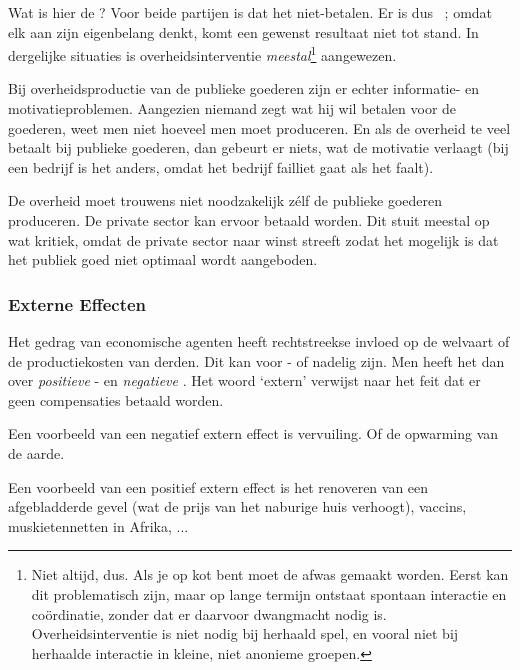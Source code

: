 Wat is hier de ? Voor beide partijen is dat het niet-betalen. Er is dus \mbox{ ;} omdat elk aan zijn eigenbelang denkt, komt een gewenst resultaat niet tot stand. In dergelijke situaties is overheidsinterventie \textit{meestal}\footnote{Niet altijd, dus. Als je op kot bent moet de afwas gemaakt worden. Eerst kan dit problematisch zijn, maar op lange termijn ontstaat spontaan interactie en co\"ordinatie, zonder dat er daarvoor dwangmacht nodig is. Overheidsinterventie is niet nodig bij herhaald spel, en vooral niet bij herhaalde interactie in kleine, niet anonieme groepen.} aangewezen.\\

\par Bij overheidsproductie van de publieke goederen zijn er echter informatie- en motivatieproblemen. Aangezien niemand zegt wat hij wil betalen voor de goederen, weet men niet hoeveel men moet produceren. En als de overheid te veel betaalt bij publieke goederen, dan gebeurt er niets, wat de motivatie verlaagt (bij een bedrijf is het anders, omdat het bedrijf failliet gaat als het faalt).
\par De overheid moet trouwens niet noodzakelijk z\'elf de publieke goederen produceren. De private sector kan ervoor betaald worden. Dit stuit meestal op wat kritiek, omdat de private sector naar winst streeft zodat het mogelijk is dat het publiek goed niet optimaal wordt aangeboden.

\subsubsection{Externe Effecten}

Het gedrag van economische agenten heeft rechtstreekse invloed op de welvaart of de productiekosten van derden. Dit kan voor - of nadelig zijn. Men heeft het dan over \textit{positieve} - en \textit{negatieve} . Het woord `extern' verwijst naar het feit dat er geen compensaties betaald worden.\\

\par\noindent Een voorbeeld van een negatief extern effect is vervuiling. Of de opwarming van de aarde.
\par\noindent Een voorbeeld van een positief extern effect is het renoveren van een afgebladderde gevel (wat de prijs van het naburige huis verhoogt), vaccins, muskietennetten in Afrika, ...\\

